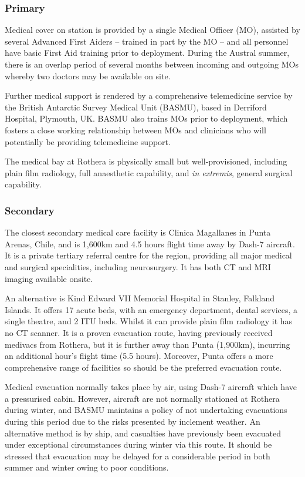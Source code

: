 \documentclass[12pt,a4paper]{article}
\begin{document}
\subsubsection{Primary}

Medical cover on station is provided by a single Medical Officer (MO), assisted by several Advanced First Aiders -- trained in part by the MO -- and all personnel have basic First Aid training prior to deployment. During the Austral summer, there is an overlap period of several months between incoming and outgoing MOs whereby two doctors may be available on site.

Further medical support is rendered by a comprehensive telemedicine service by the British Antarctic Survey Medical Unit (BASMU), based in Derriford Hospital, Plymouth, UK. BASMU also trains MOs prior to deployment, which fosters a close working relationship between MOs and clinicians who will potentially be providing telemedicine support.

The medical bay at Rothera is physically small but well-provisioned, including plain film radiology, full anaesthetic capability, and \emph{in extremis}, general surgical capability.

\subsubsection{Secondary}

The closest secondary medical care facility is Clinica Magallanes\cite{Anonymous:TgM8hVWD} in Punta Arenas, Chile, and is 1,600km and 4.5 hours flight time away by Dash-7 aircraft. It is a private tertiary referral centre for the region, providing all major medical and surgical specialities, including neurosurgery. It has both CT and MRI imaging available onsite.

An alternative is Kind Edward VII Memorial Hospital in Stanley, Falkland Islands. It offers 17 acute beds, with an emergency department, dental services, a single theatre, and 2 ITU beds.\cite{Anonymous:qFBtPcmx} Whilst it can provide plain film radiology it has no CT scanner. It is a proven evacuation route, having previously received medivacs from Rothera, but it is further away than Punta (1,900km), incurring an additional hour's flight time (5.5 hours). Moreover, Punta offers a more comprehensive range of facilities so should be the preferred evacuation route.

Medical evacuation normally takes place by air, using Dash-7 aircraft which have a pressurised cabin. However, aircraft are not normally stationed at Rothera during winter, and BASMU maintains a policy of not undertaking evacuations during this period due to the risks presented by inclement weather. An alternative method is by ship, and casualties have previously been evacuated under exceptional circumstances during winter via this route. It should be stressed that evacuation may be delayed for a considerable period in both summer and winter owing to poor conditions.
\end{document}
